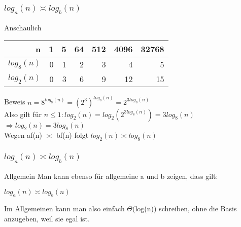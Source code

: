 \documentclass{beamer}
\begin{document}
\begin{frame}
	\frametitle{$log_a(n) \asymp log_b(n)$}
	\begin{block}{Anschaulich}
		\begin{table}
   			\begin{tabular}{|r|r|r|r|r|r|r|}
        				\hline
     				   n          & 1 & 5 & 64 & 512 & 4096 & 32768 \\ \hline
    				    $log_8(n)$ & 0 & 1 & 2  & 3   & 4    & 5     \\ 
    				    $log_2(n)$ & 0 & 3 & 6  & 9   & 12   & 15    \\
  			      	\hline
    			\end{tabular}
		\end{table}
	\end{block}
	\begin{block}{Beweis}
		$n = 8^{log_8(n)} = (2^3)^{log_8(n)} = 2^{3log_8(n)}$ \\
		Also gilt f\"ur $n \le 1: log_2(n) = log_2(2^{3log_8(n)}) = 3log_8(n)$ \\
		$\Rightarrow log_2(n) = 3log_8(n)$\\
		
		Wegen af(n) $\asymp$ bf(n) folgt $log_2(n) \asymp log_8(n)$
	\end{block}
\end{frame}

\begin{frame}
	\frametitle{$log_a(n) \asymp log_b(n)$}
	\begin{block}{Allgemein}
		Man kann ebenso f\"ur allgemeine a und b zeigen, dass gilt:
		\begin{center}
			$log_a(n) \asymp log_b(n)$
		\end{center}
		Im Allgemeinen kann man also einfach $\Theta$(log(n)) schreiben, ohne die Basis anzugeben, weil sie egal ist.
	\end{block}
\end{frame}
\end{document}
